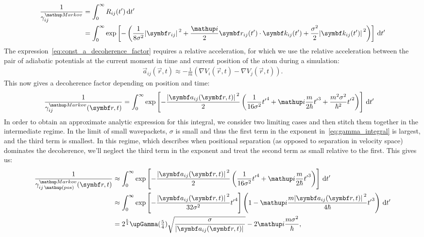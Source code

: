 \begin{align}\label{eq:gamma_integral}
\frac1{\gamma_{ij}^\up{Markov}} &= 
  \int_0^\infty R_{ij}(t^\prime) \,\dd t^\prime\\
&= \int_0^\infty \exp\left[-\left(\frac1{8\sigma^2}\abs{\vec r_{ij}}^2
+ \frac\ii 2 \vec r_{ij}(t^\prime) \cdot \vec k_{ij}(t^\prime) + \frac{\sigma^2}{2} \abs{\vec k_{ij}(t^\prime)}^2
\right)\right]\,\dd t^\prime
\end{align}
The expression~\eqref{eq:const_a_decoherence_factor} requires a relative acceleration, for which we use the relative acceleration between the pair of adiabatic potentials at the current moment in time and current position of the atom during a simulation:
\begin{align}
\vec a_{ij}(\vec r, t) \approx -\frac1 m\left(\nabla V_i(\vec r, t) - \nabla V_j(\vec r, t)\right).
\end{align}
This now gives a decoherence factor depending on position and time:
\begin{align}
\frac1{\gamma_{ij}^\up{Markov}(\vec r, t)} &=
  \int_0^\infty 
    \exp\left[
      -\frac {\abs{\vec a_{ij}(\vec r, t)}^2} 2 \left(\frac1 {16\sigma^2}{t^\prime}^4 + \ii\frac m{2\hbar}{t^\prime}^3 + \frac{m^2\sigma^2}{\hbar^2} {t^\prime}^2 \right)
      \right]
    \,\dd t^\prime\label{eq:markov_decoherence_factor_time_dep}
\end{align}
In order to obtain an approximate analytic expression for this integral, we consider two limiting cases and then stitch them together in the intermediate regime. In the limit of small wavepackets, $\sigma$ is small and thus the first term in the exponent in~\eqref{eq:gamma_integral} is largest, and the third term is smallest. In this regime, which describes when positional separation (as opposed to separation in velocity space) dominates the decoherence, we'll neglect the third term in the exponent and treat the second term as small relative to the first.
This gives us:
\begin{align}
\frac1{\gamma_{ij\,\up{(pos)}}^\up{Markov}(\vec r, t)} &\approx 
  \int_0^\infty 
    \exp\left[
      -\frac {\abs{\vec a_{ij}(\vec r, t)}^2} 2 \left(\frac1 {16\sigma^2}{t^\prime}^4 + \ii\frac m{2\hbar}{t^\prime}^3\right)
      \right]
    \,\dd t^\prime\\
      &\approx \int_0^\infty \exp\left[-
              \frac{\abs{\vec a_{ij}(\vec r, t)}^2} {32\sigma^2} {t^\prime}^4\right]\left(1 -\ii \frac {m\abs{\vec a_{ij}(\vec r, t)}^2}{4\hbar} {t^\prime}^3\right)\, \dd t^\prime\label{eq:gamma_pos_exp}\\
      &= 2^{\frac54}\upGamma(\tfrac54)\sqrt{\frac{\sigma}{\abs{\vec a_{ij}(\vec r, t)}}} - 2\ii\frac{m \sigma^2}{\hbar},\label{eq:gamma_pos_recip}
\end{align}
